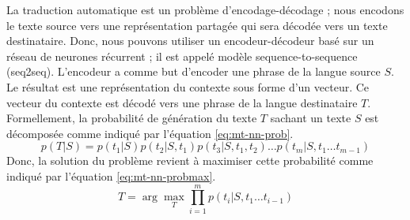 \documentclass{KodeBook}
\begin{document}
La traduction automatique est un problème d'encodage-décodage ; nous encodons le texte source vers une représentation partagée qui sera décodée vers un texte destinataire.
Donc, nous pouvons utiliser un encodeur-décodeur basé sur un réseau de neurones récurrent ; il est appelé modèle sequence-to-sequence (seq2seq).
L'encodeur a comme but d'encoder une phrase de la langue source $S$. 
Le résultat est une représentation du contexte sous forme d'un vecteur. 
Ce vecteur du contexte est décodé vers une phrase de la langue destinataire $T$. 
Formellement, la probabilité de génération du texte $T$ sachant un texte $S$ est décomposée comme indiqué par l'équation \ref{eq:mt-nn-prob}.
\begin{equation}\label{eq:mt-nn-prob}
p(T|S) = p(t_1|S) p(t_2|S, t_1) p(t_3|S, t_1, t_2)\ldots p(t_m|S, t_1\ldots t_{m-1})
\end{equation}
Donc, la solution du problème  revient à maximiser cette probabilité comme indiqué par l'équation \ref{eq:mt-nn-probmax}.
\begin{equation}\label{eq:mt-nn-probmax}
\hat{T} = \arg\max_{T} \prod_{i=1}^{m} p(t_i | S, t_1\ldots t_{i-1})
\end{equation}
\end{document}
